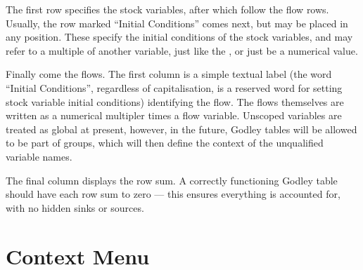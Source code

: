 The first row specifies the stock variables, after which follow the
flow rows. Usually, the row marked ``Initial Conditions'' comes next,
but may be placed in any position. These specify the initial
conditions of the stock variables, and may refer to a multiple of
another variable, just like the , or just be a numerical value.

Finally come the flows. The first column is a simple textual label
(the word ``Initial Conditions'', regardless of capitalisation, is a
reserved word for setting stock variable initial conditions)
identifying the flow. The flows themselves are written as a numerical
multipler times a flow variable. Unscoped variables are treated as
global at present, however, in the future, Godley tables will be
allowed to be part of groups, which will then define the context of
the unqualified variable names.

The final column displays the row sum. A correctly functioning Godley
table should have each row sum to zero --- this ensures everything is
accounted for, with no hidden sinks or sources.

\section{Context Menu}

